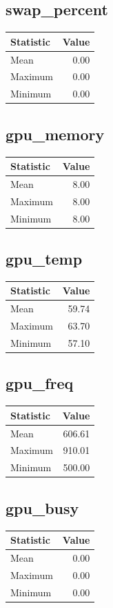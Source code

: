\documentclass[11pt]{article}
\begin{document}
\subsection{swap_percent}
\begin{tabular}{lr}
\toprule
Statistic & Value \\
\midrule
Mean & 0.00 \\
Maximum & 0.00 \\
Minimum & 0.00 \\
\bottomrule
\end{tabular}


\subsection{gpu_memory}
\begin{tabular}{lr}
\toprule
Statistic & Value \\
\midrule
Mean & 8.00 \\
Maximum & 8.00 \\
Minimum & 8.00 \\
\bottomrule
\end{tabular}


\subsection{gpu_temp}
\begin{tabular}{lr}
\toprule
Statistic & Value \\
\midrule
Mean & 59.74 \\
Maximum & 63.70 \\
Minimum & 57.10 \\
\bottomrule
\end{tabular}


\subsection{gpu_freq}
\begin{tabular}{lr}
\toprule
Statistic & Value \\
\midrule
Mean & 606.61 \\
Maximum & 910.01 \\
Minimum & 500.00 \\
\bottomrule
\end{tabular}


\subsection{gpu_busy}
\begin{tabular}{lr}
\toprule
Statistic & Value \\
\midrule
Mean & 0.00 \\
Maximum & 0.00 \\
Minimum & 0.00 \\
\bottomrule
\end{tabular}
\end{document}
